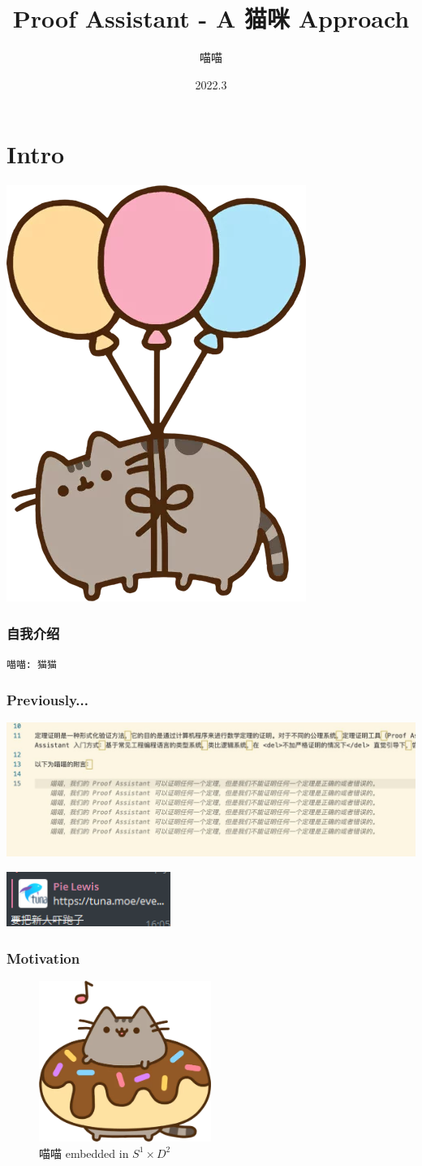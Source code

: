 \documentclass[UTF-8]{ctexbeamer}
\title{Proof Assistant - A 猫咪 Approach}
\author{喵喵}
\date{2022.3}
\begin{document}
\section{Intro}

\begin{frame}
  \titlepage
  \begin{center}
    \includegraphics[width=.1\textwidth]{assets/float.png}
  \end{center}
\end{frame}

\begin{frame}
  \frametitle{自我介绍}

  \texttt{喵喵: 猫猫}
\end{frame}

\begin{frame}
  \frametitle{Previously...}

  \includegraphics[width=\textwidth]{assets/scary.jpg}

  \includegraphics[width=0.4\textwidth]{assets/gone.png}
\end{frame}

\begin{frame}
  \frametitle{Motivation}

  \pause
  \begin{figure}
    \includegraphics[width=0.5\textwidth]{assets/doughnut.png}
    \caption{喵喵 embedded in $S^1 \times D^2$}
  \end{figure}
\end{frame}
\end{document}
